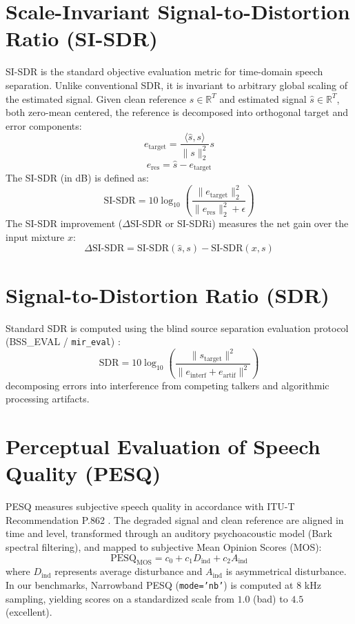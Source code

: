 \documentclass[11pt,a4paper]{report}
\begin{document}
\section{Scale-Invariant Signal-to-Distortion Ratio (SI-SDR)}
SI-SDR \cite{le2019sdr} is the standard objective evaluation metric for time-domain speech separation. Unlike conventional SDR, it is invariant to arbitrary global scaling of the estimated signal. Given clean reference $s \in \mathbb{R}^T$ and estimated signal $\hat{s} \in \mathbb{R}^T$, both zero-mean centered, the reference is decomposed into orthogonal target and error components:
\begin{equation}
    e_{\text{target}} = \frac{\langle \hat{s}, s \rangle}{\|s\|_2^2} s
\end{equation}
\begin{equation}
    e_{\text{res}} = \hat{s} - e_{\text{target}}
\end{equation}
The SI-SDR (in dB) is defined as:
\begin{equation}
    \text{SI-SDR} = 10 \log_{10} \left( \frac{\|e_{\text{target}}\|_2^2}{\|e_{\text{res}}\|_2^2 + \epsilon} \right)
    \label{eq:sisdr_formula}
\end{equation}
The SI-SDR improvement ($\Delta$SI-SDR or SI-SDRi) measures the net gain over the input mixture $x$:
\begin{equation}
    \Delta\text{SI-SDR} = \text{SI-SDR}(\hat{s}, s) - \text{SI-SDR}(x, s)
\end{equation}

\section{Signal-to-Distortion Ratio (SDR)}
Standard SDR is computed using the blind source separation evaluation protocol (BSS\_EVAL / \texttt{mir\_eval}) \cite{fevotte2005bss_eval}:
\begin{equation}
    \text{SDR} = 10 \log_{10} \left( \frac{\|s_{\text{target}}\|^2}{\|e_{\text{interf}} + e_{\text{artif}}\|^2} \right)
\end{equation}
decomposing errors into interference from competing talkers and algorithmic processing artifacts.

\section{Perceptual Evaluation of Speech Quality (PESQ)}
PESQ measures subjective speech quality in accordance with ITU-T Recommendation P.862 \cite{itu2001p862}. The degraded signal and clean reference are aligned in time and level, transformed through an auditory psychoacoustic model (Bark spectral filtering), and mapped to subjective Mean Opinion Scores (MOS):
\begin{equation}
    \text{PESQ}_{\text{MOS}} = c_0 + c_1 D_{\text{ind}} + c_2 A_{\text{ind}}
\end{equation}
where $D_{\text{ind}}$ represents average disturbance and $A_{\text{ind}}$ is asymmetrical disturbance. In our benchmarks, Narrowband PESQ (\texttt{mode='nb'}) is computed at 8 kHz sampling, yielding scores on a standardized scale from $1.0$ (bad) to $4.5$ (excellent).
\end{document}
